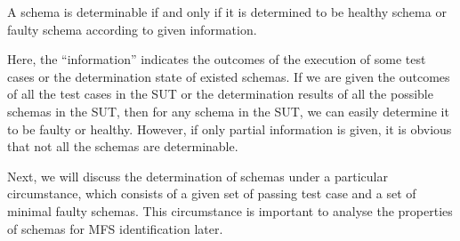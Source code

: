 
\begin{definition}\label{de:deteminable}
A schema is determinable if and only if it is determined to be healthy schema or faulty schema according to given information.
\end{definition}

Here, the ``information'' indicates the outcomes of the execution of some test cases or the determination state of existed schemas. If we are given the outcomes of all the test cases in the SUT or the determination results of all the possible schemas in the SUT, then for any schema in the SUT, we can easily determine it to be faulty or healthy. However, if only partial information is given, it is obvious that not all the schemas are determinable.

Next, we will discuss the determination of schemas under a particular circumstance, which consists of a given set of passing test case and a set of minimal faulty schemas. This circumstance is important to analyse the properties of schemas for MFS identification later.

